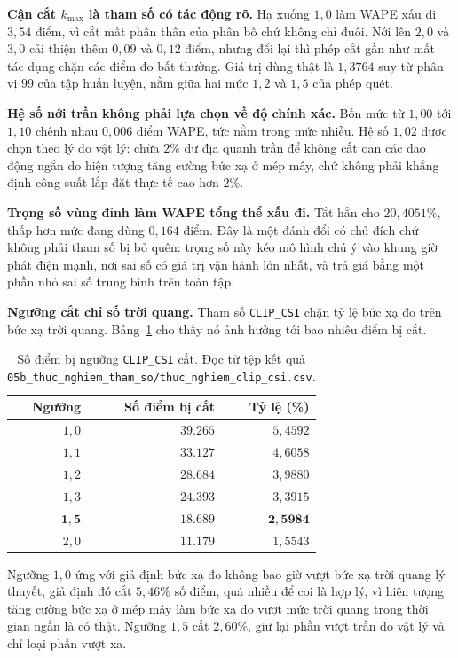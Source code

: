 \documentclass[12pt, a4paper]{report}
\begin{document}
\textbf{Cận cắt $k_{\max}$ là tham số có tác động rõ.} Hạ xuống $1{,}0$ làm WAPE xấu đi
$3{,}54$ điểm, vì cắt mất phần thân của phân bố chứ không chỉ đuôi. Nới lên $2{,}0$ và $3{,}0$
cải thiện thêm $0{,}09$ và $0{,}12$ điểm, nhưng đổi lại thì phép cắt gần như mất tác dụng chặn
các điểm đo bất thường. Giá trị dùng thật là $1{,}3764$ suy từ phân vị $99$ của tập huấn
luyện, nằm giữa hai mức $1{,}2$ và $1{,}5$ của phép quét.

\textbf{Hệ số nới trần không phải lựa chọn về độ chính xác.} Bốn mức từ $1{,}00$ tới $1{,}10$
chênh nhau $0{,}006$ điểm WAPE, tức nằm trong mức nhiễu. Hệ số $1{,}02$ được chọn theo lý do
vật lý: chừa $2\%$ dư địa quanh trần để không cắt oan các dao động ngắn do hiện tượng tăng
cường bức xạ ở mép mây, chứ không phải khẳng định công suất lắp đặt thực tế cao hơn $2\%$.

\textbf{Trọng số vùng đỉnh làm WAPE tổng thể xấu đi.} Tắt hẳn cho $20{,}4051\%$, thấp hơn mức
đang dùng $0{,}164$ điểm. Đây là một đánh đổi có chủ đích chứ không phải tham số bị bỏ quên:
trọng số này kéo mô hình chú ý vào khung giờ phát điện mạnh, nơi sai số có giá trị vận hành
lớn nhất, và trả giá bằng một phần nhỏ sai số trung bình trên toàn tập.

\textbf{Ngưỡng cắt chỉ số trời quang.} Tham số \texttt{CLIP\_CSI} chặn tỷ lệ bức xạ đo trên bức xạ
trời quang. Bảng~\ref{tab:clip_csi} cho thấy nó ảnh hưởng tới bao nhiêu điểm bị cắt.

\begin{table}[htbp]
\centering
\caption{Số điểm bị ngưỡng \texttt{CLIP\_CSI} cắt. Đọc từ tệp kết quả
\texttt{05b\_thuc\_nghiem\_tham\_so/thuc\_nghiem\_clip\_csi.csv}.}
\label{tab:clip_csi}
\small
\begin{tabular}{r r r}
\toprule
\textbf{Ngưỡng} & \textbf{Số điểm bị cắt} & \textbf{Tỷ lệ (\%)} \\
\midrule
$1{,}0$ & $39.265$ & $5{,}4592$ \\
$1{,}1$ & $33.127$ & $4{,}6058$ \\
$1{,}2$ & $28.684$ & $3{,}9880$ \\
$1{,}3$ & $24.393$ & $3{,}3915$ \\
$\mathbf{1{,}5}$ & $\mathbf{18.689}$ & $\mathbf{2{,}5984}$ \\
$2{,}0$ & $11.179$ & $1{,}5543$ \\
\bottomrule
\end{tabular}
\end{table}

Ngưỡng $1{,}0$ ứng với giả định bức xạ đo không bao giờ vượt bức xạ trời quang lý thuyết,
giả định đó cắt $5{,}46\%$ số điểm, quá nhiều để coi là hợp lý, vì hiện tượng tăng cường bức
xạ ở mép mây làm bức xạ đo vượt mức trời quang trong thời gian ngắn là có thật. Ngưỡng
$1{,}5$ cắt $2{,}60\%$, giữ lại phần vượt trần do vật lý và chỉ loại phần vượt xa.
\end{document}
